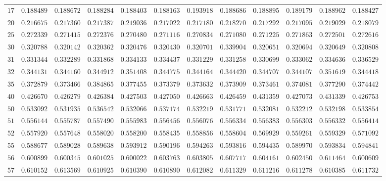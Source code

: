 \begin{sidewaystable}
\begin{tabular}{r|rrrrrrrrrrr}
$17$ & $0.188489$ & $0.188672$ & $0.188284$ & $0.188403$ & $0.188163$ & $0.193918$ & $0.188686$ & $0.188895$ & $0.189179$ & $0.188962$ & $0.188427$ \\
$20$ & $0.216675$ & $0.217360$ & $0.217387$ & $0.219036$ & $0.217022$ & $0.217180$ & $0.218270$ & $0.217292$ & $0.217095$ & $0.219029$ & $0.218079$ \\
$25$ & $0.272339$ & $0.271415$ & $0.272376$ & $0.270480$ & $0.271116$ & $0.270834$ & $0.271080$ & $0.271225$ & $0.271863$ & $0.272501$ & $0.272616$ \\
$30$ & $0.320788$ & $0.320142$ & $0.320362$ & $0.320476$ & $0.320430$ & $0.320701$ & $0.339904$ & $0.320651$ & $0.320694$ & $0.320649$ & $0.320808$ \\
$31$ & $0.331344$ & $0.332289$ & $0.331868$ & $0.334133$ & $0.334437$ & $0.331229$ & $0.331258$ & $0.330699$ & $0.333062$ & $0.334636$ & $0.336529$ \\
$32$ & $0.344131$ & $0.344160$ & $0.344912$ & $0.351408$ & $0.344775$ & $0.344164$ & $0.344420$ & $0.344707$ & $0.344107$ & $0.351619$ & $0.344418$ \\
$35$ & $0.372879$ & $0.373466$ & $0.384865$ & $0.377455$ & $0.373379$ & $0.373632$ & $0.373909$ & $0.373461$ & $0.374081$ & $0.377290$ & $0.374442$ \\
$40$ & $0.426670$ & $0.426279$ & $0.426384$ & $0.427503$ & $0.427050$ & $0.426663$ & $0.426459$ & $0.431359$ & $0.427073$ & $0.431339$ & $0.426753$ \\
$50$ & $0.533092$ & $0.531935$ & $0.536542$ & $0.532066$ & $0.537174$ & $0.532219$ & $0.531771$ & $0.532081$ & $0.532212$ & $0.532198$ & $0.533854$ \\
$51$ & $0.556144$ & $0.555787$ & $0.557490$ & $0.555983$ & $0.556456$ & $0.556076$ & $0.556334$ & $0.556383$ & $0.556303$ & $0.556332$ & $0.556414$ \\
$52$ & $0.557920$ & $0.557648$ & $0.558020$ & $0.558200$ & $0.558435$ & $0.558856$ & $0.558604$ & $0.569929$ & $0.559261$ & $0.559329$ & $0.571092$ \\
$55$ & $0.588677$ & $0.589028$ & $0.589638$ & $0.593912$ & $0.590196$ & $0.594263$ & $0.593816$ & $0.594435$ & $0.589970$ & $0.593834$ & $0.594841$ \\
$56$ & $0.600899$ & $0.600345$ & $0.601025$ & $0.600022$ & $0.603763$ & $0.603805$ & $0.607717$ & $0.604161$ & $0.602450$ & $0.611464$ & $0.600609$ \\
$57$ & $0.610152$ & $0.613569$ & $0.610925$ & $0.610390$ & $0.610890$ & $0.612082$ & $0.611329$ & $0.611216$ & $0.611278$ & $0.610385$ & $0.611732$ \\

\end{tabular}
\end{sidewaystable}
